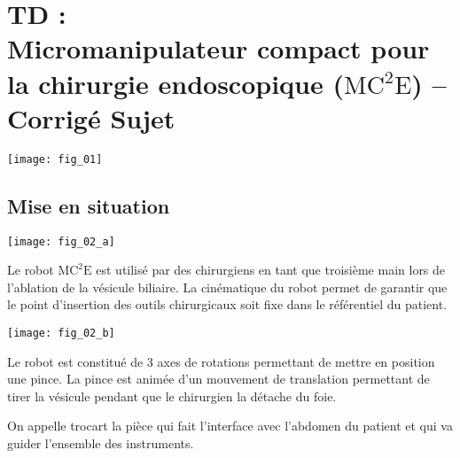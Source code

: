 \chapter*{TD  :\\ 
Micromanipulateur compact pour la chirurgie endoscopique ($\text{MC}^2\text{E}$) -- \ifprof Corrigé \else Sujet \fi}

\iflivret {} \else
\ifprof  {} \else \fi
\fi

\setcounter{question}{0}

\begin{marginfigure}
\texttt{[image: fig\_01]}
\end{marginfigure}


\section*{Mise en situation}
\ifprof
\else

\begin{marginfigure}
\texttt{[image: fig\_02\_a]}
\end{marginfigure}
Le robot $\text{MC}^2\text{E}$ est utilisé par des chirurgiens en tant que troisième main lors de l'ablation de la vésicule biliaire. La cinématique du robot permet de garantir que le point d'insertion des outils chirurgicaux soit fixe dans le référentiel du patient. 


\begin{marginfigure}
\texttt{[image: fig\_02\_b]}
\end{marginfigure}
Le robot est constitué de 3 axes de rotations permettant de mettre en position une pince. La pince est animée d'un mouvement de translation permettant de tirer la vésicule pendant que le chirurgien la détache du foie. 


On appelle trocart la pièce qui fait l'interface avec l'abdomen du patient et qui va guider l'ensemble des instruments. 


